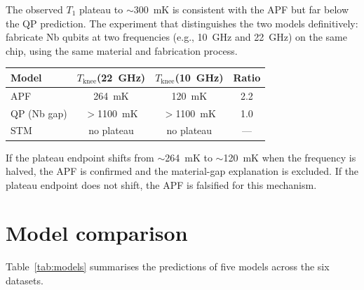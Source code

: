 \documentclass[11pt]{article}
\begin{document}
The observed $T_1$ plateau to $\sim$300~mK is consistent with the APF but far below the QP prediction.  The experiment that distinguishes the two models definitively: fabricate Nb qubits at two frequencies (e.g., 10~GHz and 22~GHz) on the same chip, using the same material and fabrication process.

\begin{center}
\renewcommand{\arraystretch}{1.3}
\begin{tabular}{lccc}
\toprule
Model & $T_{\mathrm{knee}}$(22~GHz) & $T_{\mathrm{knee}}$(10~GHz) & Ratio \\
\midrule
APF & 264~mK & 120~mK & 2.2 \\
QP (Nb gap) & $>$1100~mK & $>$1100~mK & 1.0 \\
STM & no plateau & no plateau & --- \\
\bottomrule
\end{tabular}
\end{center}

If the plateau endpoint shifts from $\sim$264~mK to $\sim$120~mK when the frequency is halved, the APF is confirmed and the material-gap explanation is excluded.  If the plateau endpoint does not shift, the APF is falsified for this mechanism.



\section{Model comparison}

Table~\ref{tab:models} summarises the predictions of five models across the six datasets.
\end{document}
